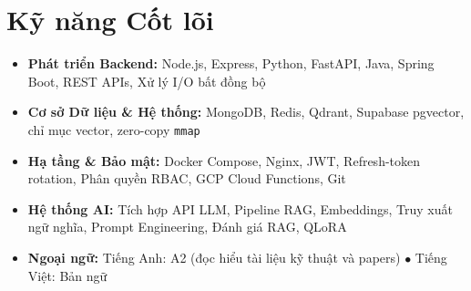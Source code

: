 \documentclass[10pt,letterpaper]{article}
\begin{document}
\section{Kỹ năng Cốt lõi}
\begin{itemize}[leftmargin=0pt, label={}, itemsep=1.2pt, topsep=1.0pt, partopsep=0pt, parsep=0pt]
  \item \small{\textbf{Phát triển Backend:} Node.js, Express, Python, FastAPI, Java, Spring Boot, REST APIs, Xử lý I/O bất đồng bộ}
  \item \small{\textbf{Cơ sở Dữ liệu \& Hệ thống:} MongoDB, Redis, Qdrant, Supabase pgvector, chỉ mục vector, zero-copy \texttt{mmap}}
  \item \small{\textbf{Hạ tầng \& Bảo mật:} Docker Compose, Nginx, JWT, Refresh-token rotation, Phân quyền RBAC, GCP Cloud Functions, Git}
  \item \small{\textbf{Hệ thống AI:} Tích hợp API LLM, Pipeline RAG, Embeddings, Truy xuất ngữ nghĩa, Prompt Engineering, Đánh giá RAG, QLoRA}
  \item \small{\textbf{Ngoại ngữ:} Tiếng Anh: A2 (đọc hiểu tài liệu kỹ thuật và papers) $\bullet$ Tiếng Việt: Bản ngữ}
\end{itemize}

\end{document}
